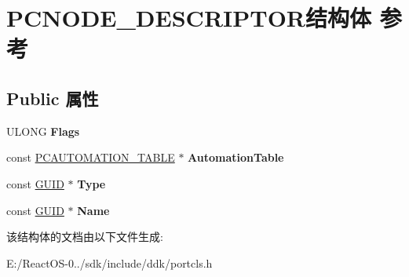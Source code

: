 \hypertarget{struct_p_c_n_o_d_e___d_e_s_c_r_i_p_t_o_r}{}\section{P\+C\+N\+O\+D\+E\+\_\+\+D\+E\+S\+C\+R\+I\+P\+T\+O\+R结构体 参考}
\label{struct_p_c_n_o_d_e___d_e_s_c_r_i_p_t_o_r}
\subsection*{Public 属性}
\begin{DoxyCompactItemize}
\item 
\mbox{\label{struct_p_c_n_o_d_e___d_e_s_c_r_i_p_t_o_r_a93b2839cae9588626add08c81aa4098c}} 
U\+L\+O\+NG {\bfseries Flags}
\item 
\mbox{\label{struct_p_c_n_o_d_e___d_e_s_c_r_i_p_t_o_r_a4f10c50738bf2e5ca284e8ea27583577}} 
const \hyperlink{struct_p_c_a_u_t_o_m_a_t_i_o_n___t_a_b_l_e}{P\+C\+A\+U\+T\+O\+M\+A\+T\+I\+O\+N\+\_\+\+T\+A\+B\+LE} $\ast$ {\bfseries Automation\+Table}
\item 
\mbox{\label{struct_p_c_n_o_d_e___d_e_s_c_r_i_p_t_o_r_aecd727faf7d2a7e40a4ce5549cf4594a}} 
const \hyperlink{interface_g_u_i_d}{G\+U\+ID} $\ast$ {\bfseries Type}
\item 
\mbox{\label{struct_p_c_n_o_d_e___d_e_s_c_r_i_p_t_o_r_a890d82fedadcf7beb5e3f527c95adbe9}} 
const \hyperlink{interface_g_u_i_d}{G\+U\+ID} $\ast$ {\bfseries Name}
\end{DoxyCompactItemize}


该结构体的文档由以下文件生成\+:\begin{DoxyCompactItemize}
\item 
E\+:/\+React\+O\+S-\/0../sdk/include/ddk/portcls.\+h\end{DoxyCompactItemize}
